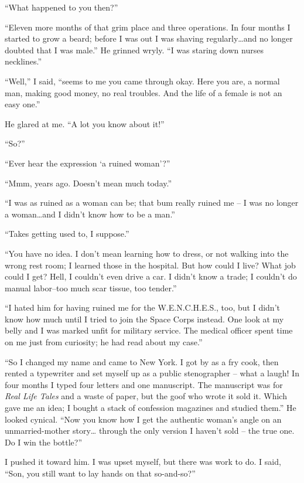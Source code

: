 ``What happened to you then?''

``Eleven more  months  of  that  grim  place  and  three
operations.  In four months I started to grow a beard; before I
was out I was shaving regularly\dots and no longer doubted that I
was male.'' He grinned wryly. ``I  was  staring  down  nurses
necklines.''

``Well,''  I  said, ``seems to me you came through okay.
Here you  are,  a  normal  man,  making  good  money,  no  real
troubles. And the life of a female is not an easy one.''

He glared at me. ``A lot you know about it!''

``So?''

``Ever hear the expression `a ruined woman'?''

``Mmm, years ago. Doesn't mean much today.''

``I  was  as  ruined  as a woman can be; that bum really
ruined me -- I was no longer a woman\dots and I didn't know how to
be a man.''

``Takes getting used to, I suppose.''

``You have no idea. I don't mean learning how to  dress,
or not walking into the wrong rest room; I learned those in the
hospital.  But  how could I live? What job could I get? Hell, I
couldn't even drive a car. I didn't know a trade; I couldn't do
manual labor--too much scar tissue, too tender.''

``I hated him for having ruined me for the W.E.N.C.H.E.S.,
too, but I didn't know how much until I tried to join
the  Space Corps instead. One look at my belly and I was marked
unfit for military service. The medical officer spent  time  on
me just from curiosity; he had read about my case.''

``So I changed my name and came to New York. I got by as
a fry cook,  then  rented  a  typewriter and set myself up as a
public stenographer -- what a laugh! In four months I typed four
letters and one manuscript. The manuscript was  for \emph{Real Life
Tales} and a waste of paper, but the goof who wrote it sold it.
Which gave me an idea; I bought a stack of confession magazines
and studied them.'' He looked cynical. ``Now you know  how  I
get the authentic woman's angle on an unmarried-mother story\dots
through the only version I haven't sold -- the true one. Do I win the bottle?''

I  pushed  it toward him. I was upset myself, but there
was work to do. I said, ``Son, you still want to  lay  hands  on
that so-and-so?''

